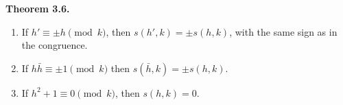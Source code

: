 \textbf{Theorem 3.6.}
\begin{enumerate}
\item[(a)] If $h' \equiv \pm h \pmod{k}$, then $s(h', k) = \pm s(h, k)$, with the same sign as in the congruence.
\item[(b)] If $h\bar{h} \equiv \pm 1 \pmod{k}$ then $s(\bar{h}, k) = \pm s(h, k)$.
\item[(c)] If $h^2 + 1 \equiv 0 \pmod{k}$, then $s(h, k) = 0$.
\end{enumerate}
